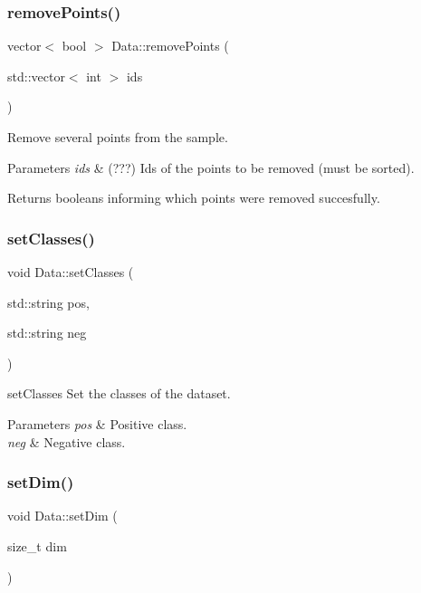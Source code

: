 \subsubsection{\texorpdfstring{remove\+Points()}{removePoints()}}
{\footnotesize\ttfamily vector$<$ bool $>$ Data\+::remove\+Points (\begin{DoxyParamCaption}\item[{std\+::vector$<$ int $>$}]{ids }\end{DoxyParamCaption})}



Remove several points from the sample. 


\begin{DoxyParams}{Parameters}
{\em ids} & (???) Ids of the points to be removed (must be sorted). \\
\hline
\end{DoxyParams}
\begin{DoxyReturn}{Returns}
booleans informing which points were removed succesfully. 
\end{DoxyReturn}
\mbox{\label{class_data_a6dd8a8a1e1659c76e5716fc8a23a86e2}} 
\subsubsection{\texorpdfstring{set\+Classes()}{setClasses()}}
{\footnotesize\ttfamily void Data\+::set\+Classes (\begin{DoxyParamCaption}\item[{std\+::string}]{pos,  }\item[{std\+::string}]{neg }\end{DoxyParamCaption})}



set\+Classes Set the classes of the dataset. 


\begin{DoxyParams}{Parameters}
{\em pos} & Positive class. \\
\hline
{\em neg} & Negative class. \\
\hline
\end{DoxyParams}
\mbox{\label{class_data_a940307fd855d626c6f18573b3eaf7009}} 
\subsubsection{\texorpdfstring{set\+Dim()}{setDim()}}
{\footnotesize\ttfamily void Data\+::set\+Dim (\begin{DoxyParamCaption}\item[{size\+\_\+t}]{dim }\end{DoxyParamCaption})}



